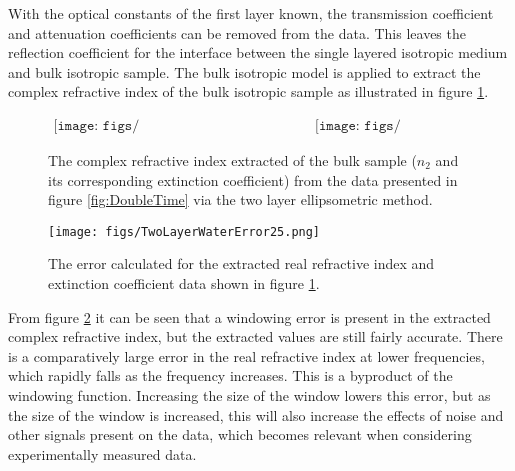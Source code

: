 With the optical constants of the first layer known, the transmission coefficient and attenuation coefficients can be removed from the data. This leaves the reflection coefficient for the interface between the single layered isotropic medium and bulk isotropic sample. The bulk isotropic model is applied to extract the complex refractive index of the bulk isotropic sample as illustrated in figure \ref{fig:DoubleExt}.

\begin{figure}[H]
                \begin{center}$
								\begin{array}{cc}
                \texttt{[image: figs/TwoLayerWaterRefractiveIndex25.png]}&
                \texttt{[image: figs/TwoLayerWaterExtinction25.png]}
								\end{array}$
								\end{center}
	\caption[Complex refractive index extracted from example of a single layer isotropic medium deposited on a bulk isotropic sample]{The complex refractive index extracted of the bulk sample ($n_{2}$ and its corresponding extinction coefficient) from the data presented in figure \ref{fig:DoubleTime} via the two layer ellipsometric method.}
	\label{fig:DoubleExt}
\end{figure}

\begin{figure}[H]
\begin{center}
	 \texttt{[image: figs/TwoLayerWaterError25.png]}
	 \caption[Two layer ellipsometry error]{The error calculated for the extracted real refractive index and extinction coefficient data shown in figure \ref{fig:DoubleExt}.}
   \label{fig:DoubleExtEr}
\end{center}
\end{figure}

From figure \ref{fig:DoubleExtEr} it can be seen that a windowing error is present in the extracted complex refractive index, but the extracted values are still fairly accurate. There is a comparatively large error in the real refractive index at lower frequencies, which rapidly falls as the frequency increases. This is a byproduct of the windowing function. Increasing the size of the window lowers this error, but as the size of the window is increased, this will also increase the effects of noise and other signals present on the data, which becomes relevant when considering experimentally measured data.

